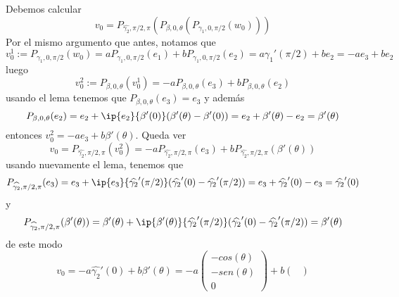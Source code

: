 \documentclass{article}
\begin{document}
\begin{enumerate}
    Debemos calcular
    \begin{equation*}
        v_{0}=P_{\widehat{\gamma_{2}},\pi/2,\pi}(P_{\beta,0,\theta}
        (P_{\gamma_{1},0,\pi/2}(w_{0})))
    \end{equation*}
    Por el mismo argumento que antes, notamos que
    \begin{equation*}
        v_{0}^{1}:=P_{\gamma_{1},0,\pi/2}(w_{0})
        =aP_{\gamma_{1},0,\pi/2}(e_{1})+bP_{\gamma_{1},0,\pi/2}(e_{2})=a\gamma_{1}'(\pi/2)+be_{2}
        =-ae_{3}+be_{2}
    \end{equation*}
    luego
    \begin{equation*}
        v_{0}^{2}:=P_{\beta,0,\theta}(v_{0}^{1})=-aP_{\beta,0,\theta}(e_{3})
        +bP_{\beta,0,\theta}(e_{2})
    \end{equation*}
    usando el lema tenemos que $P_{\beta,0,\theta}(e_{3})=e_{3}$ y además
    \begin{equation*}
        P_{\beta,0,\theta}(e_{2})=e_{2}+\ip{e_{2}}{\beta'(0)}(\beta'(\theta)-\beta'(0))
        =e_{2}+\beta'(\theta)-e_{2}=\beta'(\theta)
    \end{equation*}
    entonces $v_{0}^{2}=-ae_{3}+b\beta'(\theta)$. Queda ver
    \begin{equation*}
        v_{0}=P_{\widehat{\gamma_{2}},\pi/2,\pi}(v_{0}^{2})
        =-aP_{\widehat{\gamma_{2}},\pi/2,\pi}(e_{3})
        +bP_{\widehat{\gamma_{2}},\pi/2,\pi}(\beta'(\theta))
    \end{equation*}
    usando nuevamente el lema, tenemos que
    \begin{equation*}
        P_{\widehat{\gamma_{2}},\pi/2,\pi}(e_{3})=e_{3}
        +\ip{e_{3}}{\widehat{\gamma_{2}}'(\pi/2)}
        (\widehat{\gamma_{2}}'(0)-\widehat{\gamma_{2}}'(\pi/2))
        =e_{3}+\widehat{\gamma_{2}}'(0)-e_{3}=\widehat{\gamma_{2}}'(0)
    \end{equation*}
    y
    \begin{equation*}
        P_{\widehat{\gamma_{2}},\pi/2,\pi}(\beta'(\theta))
        =\beta'(\theta)+\ip{\beta'(\theta)}{\widehat{\gamma_{2}}'(\pi/2)}
        (\widehat{\gamma_{2}}'(0)-\widehat{\gamma_{2}}'(\pi/2))=\beta'(\theta)
    \end{equation*}
    de este modo
    \begin{equation*}
        v_{0}=-a\widehat{\gamma_{2}}'(0)+b\beta'(\theta)=-a\begin{pmatrix}
            -cos(\theta) \\ -sen(\theta) \\ 0
        \end{pmatrix}+b\begin{pmatrix}

\end{pmatrix}
\end{equation*}
\end{enumerate}
\end{document}
